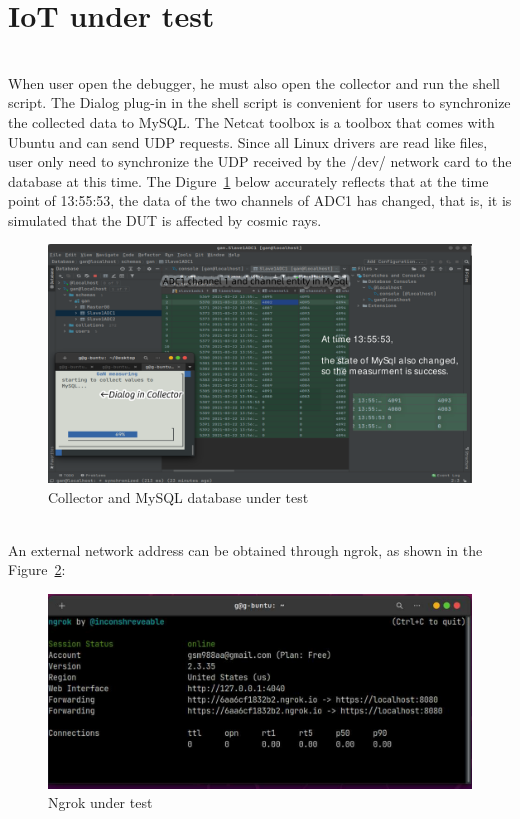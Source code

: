 \section{IoT under test}
\label{sec:IoT under test}
\\
When user open the debugger, he must also open the collector and run the shell script. The Dialog plug-in in the shell script is convenient for users to synchronize the collected data to MySQL. The Netcat toolbox is a toolbox that comes with Ubuntu and can send UDP requests. Since all Linux drivers are read like files, user only need to synchronize the UDP received by the /dev/ network card to the database at this time. The Digure~\ref{fig:7.4} below accurately reflects that at the time point of 13:55:53, the data of the two channels of ADC1 has changed, that is, it is simulated that the DUT is affected by cosmic rays. 
\begin{figure}[!ht]
	\centering
	\includegraphics[width=16cm]{grafiken/collector and database.pdf}
	\caption{Collector and MySQL database under test}
	\label{fig:7.4}
\end{figure}
\FloatBarrier
\\
An external network address can be obtained through ngrok, as shown in the Figure~\ref{fig:7.5}:
\begin{figure}[!ht]
	\centering
	\includegraphics[width=12cm]{grafiken/ngrok.pdf}
	\caption{Ngrok under test}
	\label{fig:7.5}
\end{figure}
\FloatBarrier
\\

